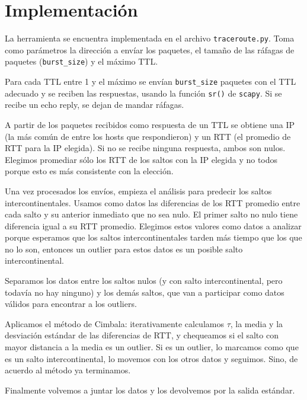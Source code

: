 \section{Implementación}
La herramienta se encuentra implementada en el archivo \texttt{traceroute.py}. Toma como parámetros la dirección a envíar los paquetes, el tamaño de las ráfagas de paquetes (\texttt{burst\_size}) y el máximo TTL.

Para cada TTL entre 1 y el máximo se envían \texttt{burst\_size} paquetes con el TTL adecuado y se reciben las respuestas, usando la función \texttt{sr()} de \texttt{scapy}. Si se recibe un echo reply, se dejan de mandar ráfagas.

A partir de los paquetes recibidos como respuesta de un TTL se obtiene una IP (la más común de entre los hosts que respondieron) y un RTT (el promedio de RTT para la IP elegida). Si no se recibe ninguna respuesta, ambos son nulos. Elegimos promediar sólo los RTT de los saltos con la IP elegida y no todos porque esto es más consistente con la elección.

Una vez procesados los envíos, empieza el análisis para predecir los saltos intercontinentales. Usamos como datos las diferencias de los RTT promedio entre cada salto y su anterior inmediato que no sea nulo. El primer salto no nulo tiene diferencia igual a su RTT promedio. Elegimos estos valores como datos a analizar porque esperamos que los saltos intercontinentales tarden más tiempo que los que no lo son, entonces un outlier para estos datos es un posible salto intercontinental.

Separamos los datos entre los saltos nulos (y con salto intercontinental, pero todavía no hay ninguno) y los demás saltos, que van a participar como datos válidos para encontrar a los outliers.

Aplicamos el método de Cimbala: iterativamente calculamos $\tau$, la media y la desviación estándar de las diferencias de RTT, y chequeamos si el salto con mayor distancia a la media es un outlier. Si es un outlier, lo marcamos como que es un salto intercontinental, lo movemos con los otros datos y seguimos. Sino, de acuerdo al método ya terminamos.

Finalmente volvemos a juntar los datos y los devolvemos por la salida estándar.
